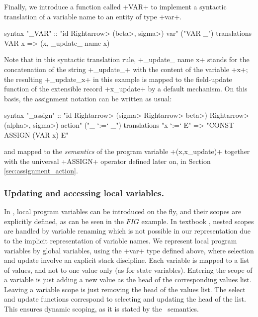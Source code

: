 \documentclass[11pt,a4paper]{article}
\begin{document}
Finally, we introduce a function called \inlineisar+VAR+ to implement a syntactic translation of a variable name to an entity of type \inlineisar+var+.
\begin{isar}
syntax "_VAR" :: "id \<Rightarrow> (\<beta>, \<sigma>) var"  ("VAR _")
translations VAR x => (x, _update_ name x)
\end{isar}
Note that in this syntactic translation rule, \inlineisar+_update_ name x+ stands for the concatenation of the string \inlineisar+_update_+ with the content of the
variable  \inlineisar+x+; the resulting \inlineisar+_update_x+ in this example is mapped to the field-update function of the extensible record \inlineisar+x_update+
by a default mechanism. 
On this basis, the assignment notation can be written as usual:
\begin{isar}
syntax
  "_assign" :: "id \<Rightarrow> (\<sigma> \<Rightarrow> \<beta>) \<Rightarrow> (\<alpha>, \<sigma>) action"  ("_ `:=` _")
translations
  "x `:=` E"   => "CONST ASSIGN (VAR x) E"
\end{isar}
and mapped to the \emph{semantics} of the program variable \inlineisar+(x,x_update)+ together with the universal \inlineisar+ASSIGN+ operator defined later on, in Section \ref{sec:assignment_action}.
\begin{comment}
as follows:
\begin{isar}
definition
  ASSIGN::"(\<beta>, \<sigma>) var \<Rightarrow> (\<sigma> \<Rightarrow> \<beta>) \<Rightarrow> (\<alpha>::ev_eq, \<sigma>) action"
where
  ASSIGN x e \<equiv>   ...
\end{isar}
The details in this definition based on UTP and embedded into \Circus-Actions can be found in Section \ref{sec:assignment_action}.
\end{comment}

\subsubsection{Updating and accessing local variables.}
In \Circus , local program variables can be introduced on the fly, and their scopes are explicitly defined, as can be seen in the %
$FIG$ example. 
In textbook \Circus , nested scopes are handled by variable renaming which is not possible in our representation due to the implicit representation of variable names.
We represent local program variables by global variables, %
using the \inlineisar+var+ type defined above, where selection and update involve an explicit stack discipline.
Each variable is mapped to a list of values, and not to one value only (as for state variables). Entering the scope of a variable 
is just adding a new value as the head of the corresponding values list. Leaving a variable scope %
is just removing the %
head of the values list. The select and update functions correspond to selecting and updating the head of the list. This ensures dynamic scoping, as it is stated by the \Circus\ semantics. 
\end{document}
